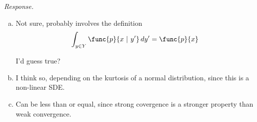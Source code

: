 \textit{Response.}

\begin{enumerate}[a)]
	\item Not sure, probably involves the definition
		\begin{equation}
			\int_{y \in Y} \func{p}{x\ \vert\ y'}\,dy' = \func{p}{x}
		\end{equation}
		
		I'd guess true?
		
	\item I think so, depending on the kurtosis of a normal distribution, since this is a non-linear SDE.
	
	\item Can be less than or equal, since strong covergence is a stronger property than weak convergence.
\end{enumerate}

